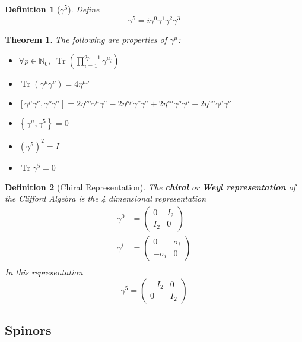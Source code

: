 \documentclass{article}
\newtheorem{theorem}{Theorem}[subsection]
\newtheorem{definition}{Definition}[subsection]
\DeclareMathOperator{\tr}{Tr}
\newcommand{\bam}[1]{\textbf{#1}}
\newcommand{\mbb}[1]{\mathbb{#1}}
\newcommand{\comm}[2][]{\left[ #1, #2 \right]} %
\newcommand{\acomm}[2][]{\left\{ #1, #2 \right\}} %
\begin{document}
\begin{definition}[$\gamma^5$]
Define
\[
\gamma^5 = i \gamma^0 \gamma^1 \gamma^2 \gamma^3
\]
\end{definition}

\begin{theorem}
The following are properties of $\gamma^\mu$:
\begin{itemize}
    \item $\forall p\in\mbb{N}_0, \; \tr \left( \prod _ { i = 1 } ^ { 2 p + 1 } \gamma ^ { \mu _ { i } } \right)$
    \item $\tr(\gamma^\mu \gamma^\nu)=4\eta^{\mu\nu}$
    \item $\comm[\gamma^\mu\gamma^\nu]{\gamma^\rho\gamma^\sigma}=2\eta^{\nu\rho}\gamma^\mu\gamma^\sigma-2\eta^{\mu\rho}\gamma^\nu\gamma^\sigma+2\eta^{\nu\sigma}\gamma^\rho\gamma^\mu-2\eta^{\mu\sigma}\gamma^\rho\gamma^\nu$
    \item $\acomm[\gamma^\mu]{\gamma^5}=0$
    \item $(\gamma^5)^2=I$
    \item $\tr{\gamma^5}=0$
\end{itemize}
\end{theorem}




\begin{definition}[Chiral Representation]
The \bam{chiral} or \bam{Weyl representation} of the Clifford Algebra is the 4 dimensional representation
\begin{align*}
    \gamma^0 &= \begin{pmatrix} 0 & I_2 \\ I_2 & 0 \end{pmatrix} \\
    \gamma^i &= \begin{pmatrix} 0 & \sigma_i \\ -\sigma_i & 0 \end{pmatrix} \\ 
\end{align*}
In this representation 
\[
\gamma^5=\begin{pmatrix} -I_2 & 0 \\ 0 & I_2 \end{pmatrix}
\]
\end{definition}

\subsection{Spinors}
\end{document}
